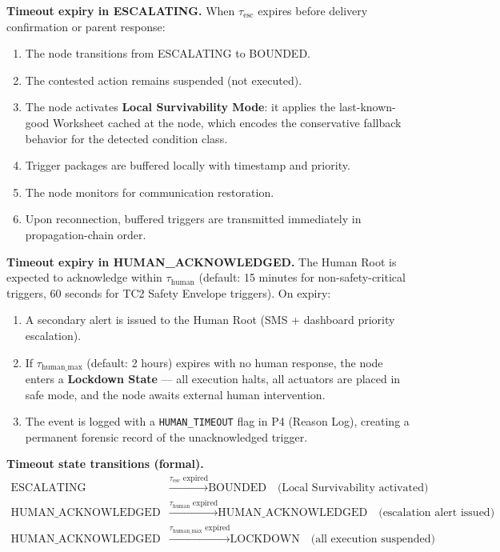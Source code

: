 \bigskip
\noindent\textbf{Timeout expiry in ESCALATING.} When $\tau_{\text{esc}}$ expires before delivery confirmation or parent response:
\begin{enumerate}
    \item The node transitions from ESCALATING to BOUNDED.
    \item The contested action remains suspended (not executed).
    \item The node activates \textbf{Local Survivability Mode}: it applies the last-known-good Worksheet cached at the node, which encodes the conservative fallback behavior for the detected condition class.
    \item Trigger packages are buffered locally with timestamp and priority.
    \item The node monitors for communication restoration.
    \item Upon reconnection, buffered triggers are transmitted immediately in propagation-chain order.
\end{enumerate}

\bigskip
\noindent\textbf{Timeout expiry in HUMAN\_ACKNOWLEDGED.} The Human Root is expected to acknowledge within $\tau_{\text{human}}$ (default: 15 minutes for non-safety-critical triggers, 60 seconds for TC2 Safety Envelope triggers). On expiry:
\begin{enumerate}
    \item A secondary alert is issued to the Human Root (SMS + dashboard priority escalation).
    \item If $\tau_{\text{human\_max}}$ (default: 2 hours) expires with no human response, the node enters a \textbf{Lockdown State} — all execution halts, all actuators are placed in safe mode, and the node awaits external human intervention.
    \item The event is logged with a \texttt{HUMAN\_TIMEOUT} flag in P4 (Reason Log), creating a permanent forensic record of the unacknowledged trigger.
\end{enumerate}

\bigskip
\noindent\textbf{Timeout state transitions (formal).}
\begin{align}
\text{ESCALATING} &\xrightarrow{\tau_{\text{esc}} \text{ expired}} \text{BOUNDED} \quad \text{(Local Survivability activated)} \\
\text{HUMAN\_ACKNOWLEDGED} &\xrightarrow{\tau_{\text{human}} \text{ expired}} \text{HUMAN\_ACKNOWLEDGED} \quad \text{(escalation alert issued)} \\
\text{HUMAN\_ACKNOWLEDGED} &\xrightarrow{\tau_{\text{human\_max}} \text{ expired}} \text{LOCKDOWN} \quad \text{(all execution suspended)}
\end{align}

